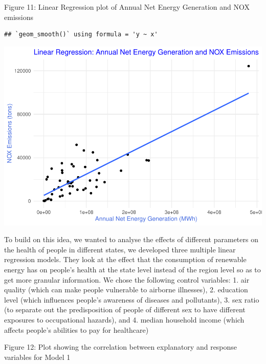 \documentclass[
]{article}
\begin{document}
Figure 11: Linear Regression plot of Annual Net Energy Generation and
NOX emissions

\begin{verbatim}
## `geom_smooth()` using formula = 'y ~ x'
\end{verbatim}

\begin{center}\includegraphics{EDA_Project_Mutha_Kry_Ghosh_VS_files/figure-latex/Q5_NOX-1} \end{center}

To build on this idea, we wanted to analyse the effects of different
parameters on the health of people in different states, we developed
three multiple linear regression models. They look at the effect that
the consumption of renewable energy has on people's health at the state
level instead of the region level so as to get more granular
information. We chose the following control variables: 1. air quality
(which can make people vulnerable to airborne illnesses), 2. education
level (which influences people's awareness of diseases and pollutants),
3. sex ratio (to separate out the predisposition of people of different
sex to have different exposures to occupational hazards), and 4. median
household income (which affects people's abilities to pay for
healthcare)

Figure 12: Plot showing the correlation between explanatory and response
variables for Model 1
\end{document}
